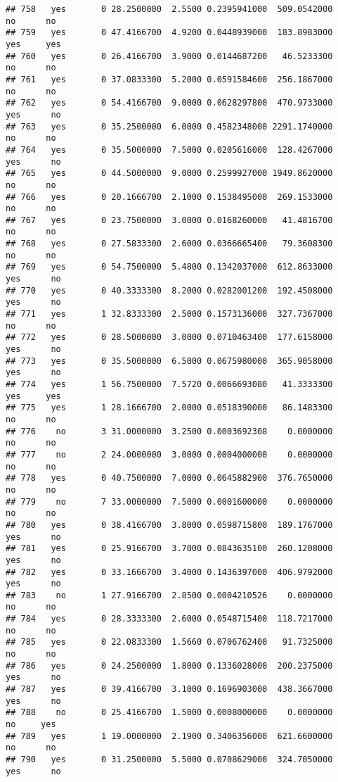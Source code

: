 \documentclass[]{article}
\begin{document}
\begin{verbatim}
## 758   yes       0 28.2500000  2.5500 0.2395941000  509.0542000    no      no
## 759   yes       0 47.4166700  4.9200 0.0448939000  183.8983000   yes     yes
## 760   yes       0 26.4166700  3.9000 0.0144687200   46.5233300    no      no
## 761   yes       0 37.0833300  5.2000 0.0591584600  256.1867000    no      no
## 762   yes       0 54.4166700  9.0000 0.0628297800  470.9733000   yes      no
## 763   yes       0 35.2500000  6.0000 0.4582348000 2291.1740000    no      no
## 764   yes       0 35.5000000  7.5000 0.0205616000  128.4267000   yes      no
## 765   yes       0 44.5000000  9.0000 0.2599927000 1949.8620000    no      no
## 766   yes       0 20.1666700  2.1000 0.1538495000  269.1533000    no      no
## 767   yes       0 23.7500000  3.0000 0.0168260000   41.4816700    no      no
## 768   yes       0 27.5833300  2.6000 0.0366665400   79.3608300    no      no
## 769   yes       0 54.7500000  5.4800 0.1342037000  612.8633000   yes      no
## 770   yes       0 40.3333300  8.2000 0.0282001200  192.4508000   yes      no
## 771   yes       1 32.8333300  2.5000 0.1573136000  327.7367000    no      no
## 772   yes       0 28.5000000  3.0000 0.0710463400  177.6158000   yes      no
## 773   yes       0 35.5000000  6.5000 0.0675980000  365.9058000   yes      no
## 774   yes       1 56.7500000  7.5720 0.0066693080   41.3333300   yes     yes
## 775   yes       1 28.1666700  2.0000 0.0518390000   86.1483300    no      no
## 776    no       3 31.0000000  3.2500 0.0003692308    0.0000000    no      no
## 777    no       2 24.0000000  3.0000 0.0004000000    0.0000000    no      no
## 778   yes       0 40.7500000  7.0000 0.0645882900  376.7650000    no      no
## 779    no       7 33.0000000  7.5000 0.0001600000    0.0000000    no      no
## 780   yes       0 38.4166700  3.8000 0.0598715800  189.1767000   yes      no
## 781   yes       0 25.9166700  3.7000 0.0843635100  260.1208000   yes      no
## 782   yes       0 33.1666700  3.4000 0.1436397000  406.9792000   yes      no
## 783    no       1 27.9166700  2.8500 0.0004210526    0.0000000    no      no
## 784   yes       0 28.3333300  2.6000 0.0548715400  118.7217000    no      no
## 785   yes       0 22.0833300  1.5660 0.0706762400   91.7325000    no      no
## 786   yes       0 24.2500000  1.8000 0.1336028000  200.2375000   yes      no
## 787   yes       0 39.4166700  3.1000 0.1696903000  438.3667000   yes      no
## 788    no       0 25.4166700  1.5000 0.0008000000    0.0000000    no     yes
## 789   yes       1 19.0000000  2.1900 0.3406356000  621.6600000    no      no
## 790   yes       0 31.2500000  5.5000 0.0708629000  324.7050000   yes      no

\end{verbatim}
\end{document}
